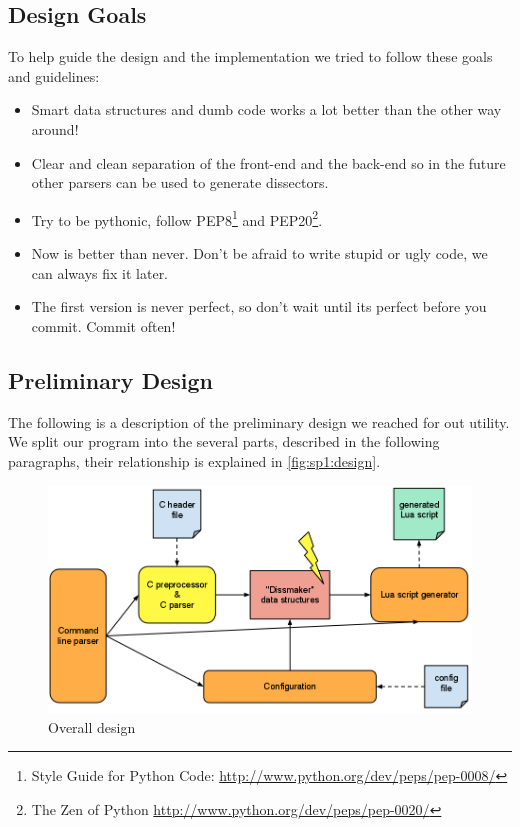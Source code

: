 \subsection{Design Goals}
To help guide the design and the implementation we tried to follow these
goals and guidelines:
\begin{itemize}
	\item Smart data structures and dumb code works a lot better than the other
		way around\cite{Raymond1999}!
	\item Clear and clean separation of the front-end and the back-end so in the
		future other parsers can be used to generate dissectors.
	\item Try to be pythonic, follow
		PEP8\footnote{Style Guide for Python Code: \url{http://www.python.org/dev/peps/pep-0008/}} and
		PEP20\footnote{The Zen of Python \url{http://www.python.org/dev/peps/pep-0020/}}.
	\item Now is better than never. Don't be afraid to write stupid or ugly
		code, we can always fix it later.
	\item The first version is never perfect, so don't wait until its perfect
		before you commit. Commit often!
\end{itemize}

\subsection{Preliminary Design}
The following is a description of the preliminary design we reached for out
utility. We split our program into the several parts, described in the
following paragraphs, their relationship is explained in
\autoref{fig:sp1:design}.

\begin{figure}[!htb]
	\center
	\includegraphics[width=\textwidth]{./sprints/img/design}
	\caption{Overall design\label{fig:sp1:design}}
\end{figure}

